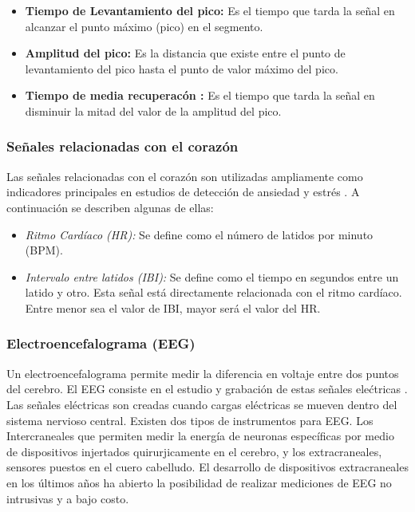 \begin{itemize}
        \item{\textbf{Tiempo de Levantamiento del pico:}} Es el tiempo que tarda la se\~nal en alcanzar el punto m\'aximo (pico) en el segmento.
        \item{\textbf{Amplitud del pico:}} Es la distancia que existe entre el punto de levantamiento del pico hasta el punto de valor m\'aximo del pico.
        \item{\textbf{Tiempo de media recuperac\'on :}} Es el tiempo que tarda la se\~nal en disminuir la mitad del valor de la amplitud del pico.
\end{itemize}


	\subsubsection{Se\~nales relacionadas con el coraz\'on}\label{secc:hearthrate}
	Las se\~nales relacionadas con el coraz\'on son utilizadas ampliamente como indicadores principales en estudios de detecci\'on de ansiedad y estr\'es \citep{Sharma20121287}. A continuaci\'on se describen algunas de ellas:
	\begin{itemize}
		\item \textit{Ritmo Card\'iaco (HR):} Se define como el n\'umero de latidos por minuto (BPM).
		\item \textit{Intervalo entre latidos (IBI):} Se define como el tiempo en segundos entre un latido y otro. Esta se\~nal est\'a directamente relacionada con el ritmo card\'iaco. Entre menor sea el valor de IBI, mayor ser\'a el valor del HR.
	\end{itemize}
	\subsubsection{Electroencefalograma (EEG)}\label{secc:eeg}
	Un electroencefalograma permite medir la diferencia en voltaje entre dos puntos del cerebro. El EEG consiste en el estudio y grabaci\'on de estas se\~nales ele\'ctricas \citep{tatum2014handbook}. Las se\~nales el\'ectricas son creadas cuando cargas el\'ectricas se mueven dentro del sistema nervioso central. Existen dos tipos de instrumentos para EEG. Los Intercraneales que permiten medir la energ\'ia de neuronas espec\'ificas por medio de dispositivos injertados quirurjicamente en el cerebro, y los extracraneales, sensores puestos en el cuero cabelludo. El desarrollo de dispositivos extracraneales en los \'ultimos a\~nos ha abierto la posibilidad de realizar mediciones de EEG no intrusivas y a bajo costo.
